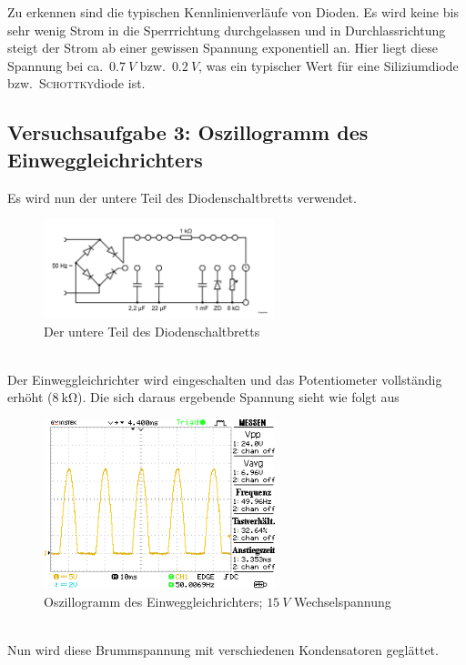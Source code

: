 \documentclass[a4paper,10pt]{article}
\numberwithin{equation}{section}
\begin{document}
Zu erkennen sind die typischen Kennlinienverläufe von Dioden.
Es wird keine bis sehr wenig Strom in die Sperrrichtung durchgelassen und in Durchlassrichtung steigt der Strom ab einer gewissen Spannung exponentiell an.
Hier liegt diese Spannung bei ca.\ $\SI{0.7}{V}$ bzw.\ $\SI{0.2}{V}$, was ein typischer Wert für eine Siliziumdiode bzw.\ \textsc{Schottky}diode ist.

\subsection{Versuchsaufgabe 3: Oszillogramm des Einweggleichrichters}
Es wird nun der untere Teil des Diodenschaltbretts verwendet.
\begin{figure}[h!]
        \centering
        \includegraphics[width=0.6\textwidth]{diodenschaltbrett_unten.png}
        \caption{Der untere Teil des Diodenschaltbretts}
\end{figure}\\
Der Einweggleichrichter wird eingeschalten und das Potentiometer vollständig erhöht ($\SI{8}{\kilo \ohm}$).
Die sich daraus ergebende Spannung sieht wie folgt aus
\begin{figure}[h]
        \centering
        \includegraphics[width=0.6\textwidth]{data/a3_a.BMP.png}
        \caption{Oszillogramm des Einweggleichrichters; $\SI{15}{V}$ Wechselspannung}
\end{figure}\\
Nun wird diese Brummspannung mit verschiedenen Kondensatoren geglättet.
\end{document}
